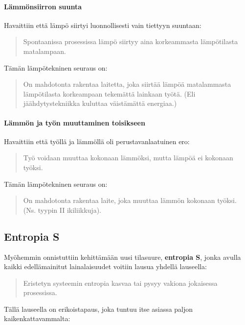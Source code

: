 \documentclass[12pt,a4paper,finnish]{book}
\begin{document}
\paragraph{Lämmönsiirron suunta}

Havaittiin että lämpö siirtyi luonnollisesti vain tiettyyn suuntaan:

\begin{quote}
 Spontaanissa prosessissa lämpö siirtyy aina korkeammasta lämpötilasta matalampaan.
\end{quote}

Tämän lämpötekninen seuraus on:

\begin{quote}
 On mahdotonta rakentaa laitetta, joka siirtää lämpöä matalammasta lämpötilasta korkeampaan tekemättä 
 lainkaan työtä. (Eli jäähdytystekniikka kuluttaa väistämättä energiaa.)
\end{quote}

\paragraph{Lämmön ja työn muuttaminen toisikseen}

Havaittiin että työllä ja lämmöllä oli perustavanlaatuinen ero:

\begin{quote}
 Työ voidaan muuttaa kokonaan lämmöksi, mutta lämpöä ei kokonaan työksi.
\end{quote}

Tämän lämpötekninen seuraus on:

\begin{quote}
 On mahdotonta rakentaa laite, joka muuttaa lämmön kokonaan työksi. (Ns. tyypin II ikiliikkuja).
\end{quote}

\subsection{Entropia S}

Myöhemmin onnistuttiin kehittämään uusi tilasuure, \textbf{entropia S}, jonka avulla kaikki
edellämainitut lainalaisuudet voitiin lausua yhdellä lauseella:

\begin{quote}
 Eristetyn systeemin entropia kasvaa tai pysyy vakiona jokaisessa prosessissa.
\end{quote}

Tällä lauseella on erikoistapaus, joka tuntuu itse asiassa paljon kaikenkattavammalta:
\end{document}
